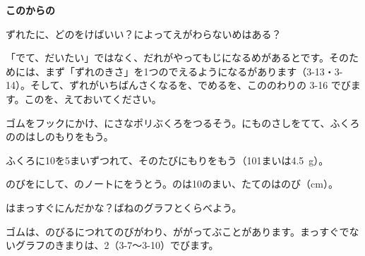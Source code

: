 \begin{hatena}
\textbf{このからの}\par\noindent
ずれたに、どのをけばいい？\quad {}によってえがわらないめはある？
\end{hatena}

「でて、だいたい」ではなく、だれがやってもじになるめがあるとです。そのためには、まず「ずれのきさ」を1つのでえるようになるがあります（3-13・3-14）。そして、ずれがいちばんさくなるを、でめるを、こののわりの 3-16 でびます。このを、えておいてください。

\begin{yattemiyou}[\R{輪}{わ}ゴムでもやってみよう]
\begin{enumerate}[label={\bkcircled[bkGreen]{\arabic*}}, leftmargin=2.4\zw, itemsep=1pt, topsep=2pt]
\item {}ゴムをフックにかけ、にさなポリぶくろをつるそう。にものさしをてて、ふくろののはしのもりをもう。
\item ふくろに10を5まいずつれて、そのたびにもりをもう（101まいは\qty{4.5}{g}）。
\item のびをにして、のノートにをうとう。のは10のまい、たてのはのび（cm）。
\item {}はまっすぐにんだかな？\quad ばねのグラフとくらべよう。
\end{enumerate}
ゴムは、のびるにつれてのびがわり、ががってぶことがあります。まっすぐでないグラフのきまりは、2（3-7〜3-10）でびます。
\end{yattemiyou}

